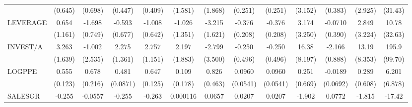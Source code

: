 \begin{table}[htbp]
\begin{tabular}{l*{12}{c}}
                    &     (0.645)         &     (0.698)         &     (0.447)         &     (0.409)         &     (1.581)         &     (1.868)         &     (0.251)         &     (0.251)         &     (3.152)         &     (0.383)         &     (2.925)         &     (31.43)         \\
LEVERAGE            &       0.654         &      -1.698\sym{**} &      -0.593         &      -1.008         &      -1.026         &      -3.215\sym{*}  &      -0.376\sym{*}  &      -0.376\sym{*}  &       3.174         &     -0.0710         &       2.849         &       10.78         \\
                    &     (1.161)         &     (0.749)         &     (0.677)         &     (0.642)         &     (1.351)         &     (1.621)         &     (0.208)         &     (0.208)         &     (3.250)         &     (0.390)         &     (3.224)         &     (32.63)         \\
INVEST/A            &       3.263\sym{*}  &      -1.002         &       2.275         &       2.757\sym{**} &       2.197         &      -2.799         &      -0.250         &      -0.250         &       16.38\sym{*}  &      -2.166\sym{**} &       13.19         &       195.9\sym{*}  \\
                    &     (1.639)         &     (2.535)         &     (1.361)         &     (1.151)         &     (1.883)         &     (3.500)         &     (0.496)         &     (0.496)         &     (8.197)         &     (0.888)         &     (8.353)         &     (99.70)         \\
LOGPPE              &       0.555\sym{***}&       0.678\sym{***}&       0.481\sym{***}&       0.647\sym{***}&       0.109         &       0.826         &      0.0960         &      0.0960         &       0.251         &     -0.0189         &       0.289         &       6.201         \\
                    &     (0.123)         &     (0.216)         &    (0.0871)         &     (0.125)         &     (0.178)         &     (0.463)         &    (0.0541)         &    (0.0541)         &     (0.669)         &    (0.0692)         &     (0.608)         &     (6.878)         \\
SALESGR             &      -0.255         &     -0.0557         &      -0.255         &      -0.263\sym{*}  &    0.000116         &      0.0657         &      0.0207         &      0.0207         &      -1.902         &      0.0772         &      -1.815         &      -17.42         \\

\end{tabular}
\end{table}
